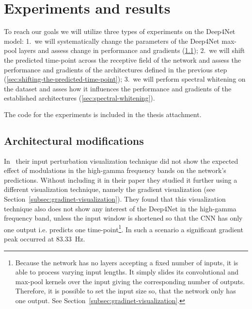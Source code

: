\chapter{Experiments and results}
\label{ch:exp}

To reach our goals we will utilize three types of experiments on the Deep4Net model:
1.~we will systematically change the parameters of the Deep4Net max-pool layers and assess change in performance and gradients (\ref{sec:architectural-modifications}); 2.~we will shift the predicted time-point across the receptive field of the network and assess the performance and gradients of the architectures defined in the previous step (\ref{sec:shifting-the-predicted-time-point}); 3.~we will perform spectral whitening on the dataset and asses how it influences the performance and gradients of the established architectures (\ref{sec:spectral-whitening}). 

The code for the experiments is included in the thesis attachment. 

\section{Architectural modifications}\label{sec:architectural-modifications}
In~\cite{Hammer-2021} their input perturbation visualization technique did not show the expected effect of modulations in the high-gamma frequency bands on the network's predictions.
Without including it in their paper they studied it further using a different visualization technique, namely the gradient visualization (see Section~\ref{subsec:gradinet-visualization}). 
They found that this visualization technique also does not show any interest of the Deep4Net in the high-gamma frequency band, unless the input window is shortened so that the CNN has only one output i.e. predicts one time-point\footnote{Because the network has no layers accepting a fixed number of inputs, it is able to process varying input lengths. It simply slides its convolutional and max-pool kernels over the input giving the corresponding number of outputs. Therefore, it is possible to set the input size so, that the network only has one output. See Section~\ref{subsec:gradinet-visualization}.}.
In such a scenario a significant gradient peak occurred at 83.33~Hz.


